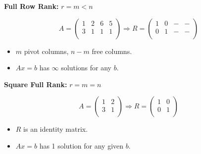\documentclass[12pt]{article}
\begin{document}
\textbf{Full Row Rank:} $r=m<n$

\[
A=
\left(
    \begin{matrix}
        1 & 2 & 6 & 5\\
        3 & 1 & 1 & 1\\
    \end{matrix}
\right)
\Rightarrow
R=
\left(
    \begin{matrix}
        1 & 0 & - & -\\
        0 & 1 & - & -\\
    \end{matrix}
\right)
\]

\begin{itemize}
    \item $m$ pivot columns, $n-m$ free columns.
    \item $Ax=b$ has $\infty$ solutions for any $b$.
\end{itemize}

\textbf{Square Full Rank:} $r=m=n$

\[
A=
\left(
    \begin{matrix}
        1 & 2\\
        3 & 1\\
    \end{matrix}
\right)
\Rightarrow
R=
\left(
    \begin{matrix}
        1 & 0\\
        0 & 1\\
    \end{matrix}
\right)
\]

\begin{itemize}
    \item $R$ is an identity matrix.
    \item $Ax=b$ has 1 solution for any given $b$.
\end{itemize}
\end{document}
